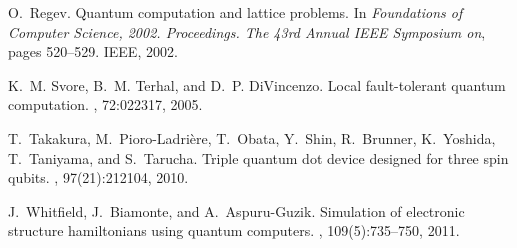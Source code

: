 \documentclass{article}
\begin{document}
\begin{thebibliography}{10}
O.~Regev.
\newblock Quantum computation and lattice problems.
\newblock In {\em Foundations of Computer Science, 2002. Proceedings. The 43rd
  Annual IEEE Symposium on}, pages 520--529. IEEE, 2002.

K.~M. Svore, B.~M. Terhal, and D.~P. DiVincenzo.
\newblock Local fault-tolerant quantum computation.
, 72:022317, 2005.

T.~Takakura, M.~Pioro-Ladri{\`e}re, T.~Obata, Y.~Shin, R.~Brunner, K.~Yoshida,
  T.~Taniyama, and S.~Tarucha.
\newblock Triple quantum dot device designed for three spin qubits.
, 97(21):212104, 2010.

J.~Whitfield, J.~Biamonte, and A.~Aspuru-Guzik.
\newblock Simulation of electronic structure hamiltonians using quantum
  computers.
, 109(5):735--750, 2011.

\end{thebibliography}
\end{document}
